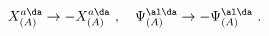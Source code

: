 \begin{equation}
 X_{(A)}^{a\da}  \rightarrow  - X_{(A)}^{a\da}~, ~~~
 \Psi^{\al\da}_{(A)}  \rightarrow  - \Psi^{\al\da}_{(A)}~.
\end{equation} 
